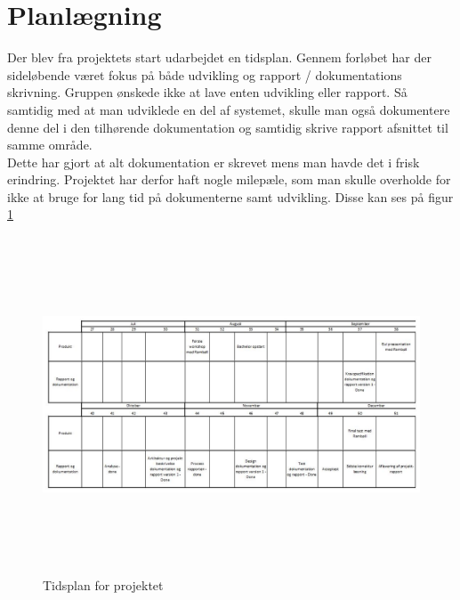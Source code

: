 \section{Planlægning}
Der blev fra projektets start udarbejdet en tidsplan.
Gennem forløbet har der sideløbende været fokus på både udvikling og rapport / dokumentations skrivning.
Gruppen ønskede ikke at lave enten udvikling eller rapport. Så samtidig med at man udviklede en del af systemet, skulle man også dokumentere denne del i den tilhørende dokumentation og samtidig skrive rapport afsnittet til samme område. \\
Dette har gjort at alt dokumentation er skrevet mens man havde det i frisk erindring.
Projektet har derfor haft nogle milepæle, som man skulle overholde for ikke at bruge for lang tid på dokumenterne samt udvikling. Disse kan ses på figur \ref{fig:Tidsplan}

\begin{figure} [H]
	\begin{center}
		\includegraphics[height=10cm, width=18cm]{Moeder/Tidsplan}
	\end{center}
	\caption{Tidsplan for projektet}
	\label{fig:Tidsplan}
\end{figure}


